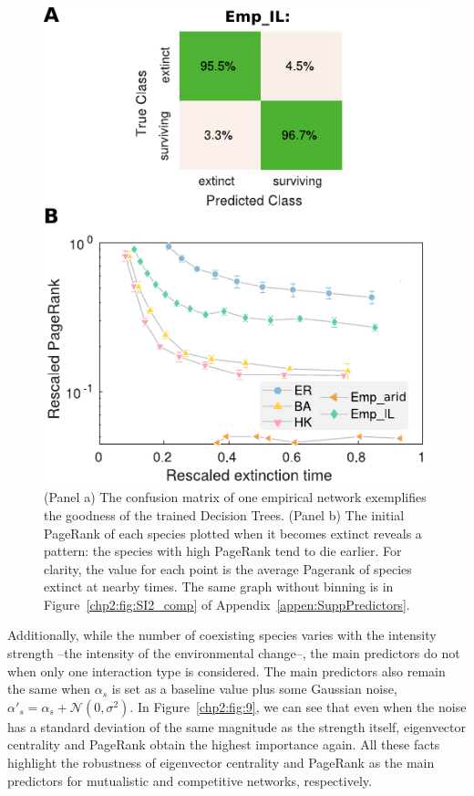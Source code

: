 \begin{figure}
    \centering
    \includegraphics{figures/chp2/fig_8.pdf}
    \caption[Confusion matrix and time evolution of PageRank in competitive communities]{(Panel a) The confusion matrix of one empirical network exemplifies the goodness of the trained Decision Trees. (Panel b) The initial PageRank of each species plotted when it becomes extinct reveals a pattern: the species with high PageRank tend to die earlier. For clarity, the value for each point is the average Pagerank of species extinct at nearby times. The same graph without binning is in Figure~\ref{chp2:fig:SI2_comp} of Appendix~\ref{appen:SuppPredictors}. }
    \label{chp2:fig:8}
\end{figure}

Additionally, while the number of coexisting species varies with the intensity strength --the intensity of the environmental change--, the main predictors do not when only one interaction type is considered. The main predictors also remain the same when $\alpha_s$ is set as a baseline value plus some Gaussian noise, $\alpha'_s  = \alpha_s + \mathcal{N}(0,\sigma^2)$. In Figure~\ref{chp2:fig:9}, we can see that even when the noise has a standard deviation of the same magnitude as the strength itself, eigenvector centrality and  PageRank obtain the highest importance again. All these facts highlight the robustness of eigenvector centrality and PageRank as the main predictors for mutualistic and competitive networks, respectively. \\

